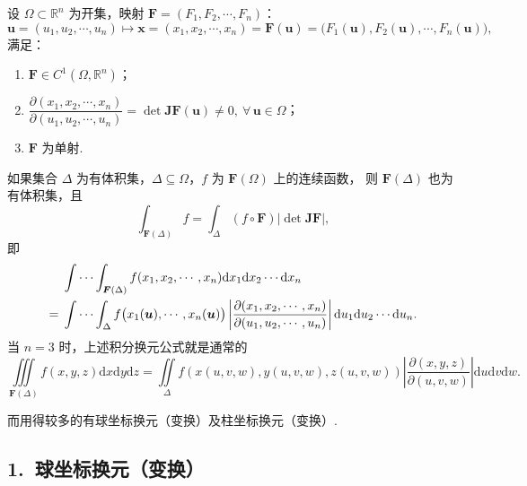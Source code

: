 \begin{theorem}\label{thm:10.5.4}
设 $\Omega \subset \mathbb{R}^n$ 为开集，映射 $\boldsymbol{F} = (F_1, F_2, \cdots, F_n)$：
\[
\boldsymbol{u} = (u_1, u_2, \cdots, u_n) \longmapsto
  \boldsymbol{x} = (x_1, x_2, \cdots, x_n) = \boldsymbol{F}(\boldsymbol{u})
  = \bigl(F_1(\boldsymbol{u}), F_2(\boldsymbol{u}), \cdots, F_n(\boldsymbol{u})\bigr),
\]
满足：
\begin{enumerate}
  \item[$(1^\circ)$] $\boldsymbol{F} \in C^1(\Omega, \mathbb{R}^n)$；
  \item[$(2^\circ)$] $\dfrac{\partial(x_1, x_2, \cdots, x_n)}{\partial(u_1, u_2, \cdots, u_n)}
    = \det \boldsymbol{J}\boldsymbol{F}(\boldsymbol{u}) \neq 0,\ \forall\, \boldsymbol{u} \in \Omega$；
  \item[$(3^\circ)$] $\boldsymbol{F}$ 为单射.
\end{enumerate}
如果集合 $\Delta$ 为有体积集，$\Delta \subseteq \Omega$，$f$ 为 $\boldsymbol{F}(\Omega)$ 上的连续函数，
则 $\boldsymbol{F}(\Delta)$ 也为有体积集，且
\[
\int_{\boldsymbol{F}(\Delta)} f = \int_{\Delta} (f \circ \boldsymbol{F}) \left| \det \boldsymbol{J}\boldsymbol{F} \right|,
\]
即
\begin{align*}
&\idotsint_{\boldsymbol{F}(\Delta)}
  f(x_1, x_2, \cdots, x_n) \mathrm{d}x_1 \mathrm{d}x_2 \cdots \mathrm{d}x_n \notag\\
={}&\idotsint_{\Delta}
  f\bigl(x_1(\boldsymbol{u}), \cdots, x_n(\boldsymbol{u})\bigr)
  \left| \frac{\partial(x_1, x_2, \cdots, x_n)}{\partial(u_1, u_2, \cdots, u_n)} \right|
  \mathrm{d}u_1 \mathrm{d}u_2 \cdots \mathrm{d}u_n.
\end{align*}
当 $n = 3$ 时，上述积分换元公式就是通常的
\[
\iiint \limits_{\boldsymbol{F}(\Delta)} f(x, y, z) \mathrm{d}x \mathrm{d}y \mathrm{d}z
= \iint \limits_{\Delta} f(x(u, v, w), y(u, v, w), z(u, v, w))
  \left| \frac{\partial(x, y, z)}{\partial(u, v, w)} \right| \mathrm{d}u \mathrm{d}v \mathrm{d}w.
\]
\end{theorem}
而用得较多的有球坐标换元（变换）及柱坐标换元（变换）.

\subsection*{1.\ 球坐标换元（变换）}

